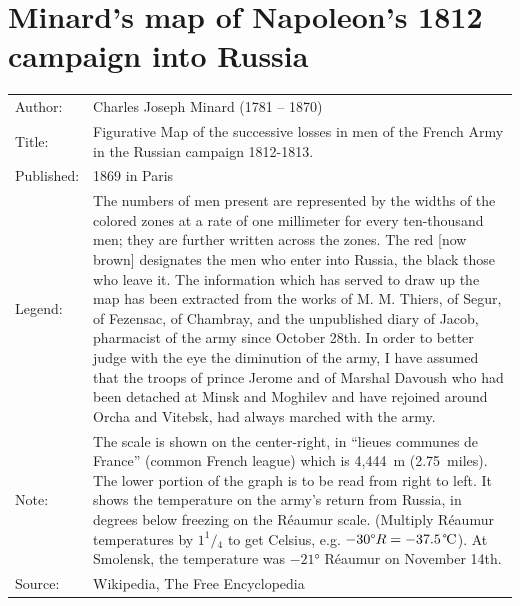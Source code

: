 \documentclass[a4paper,12pt,oneside]{book}
\begin{document}
\cleardoublepage
{}
{}
\listoffigures
\cleardoublepage
{}
{}
\listoftables

\appendix
\chapter{Minard’s map of Napoleon’s 1812 campaign into Russia}
\label{appdx:minard}
\begin{singlespace}
\begin{center}
\setlength{\extrarowheight}{3pt}
 \begin{tabularx}{\linewidth}{lX}
 Author:& Charles Joseph Minard (1781 -- 1870)\\
 Title:& Figurative Map of the successive losses in men of the French Army in the Russian campaign 1812-1813.\\
 Published: & 1869 in Paris \\
 Legend:& The numbers of men present are represented by the widths of the colored zones
 at a rate of one millimeter for every ten-thousand men; they are further written across the zones.
 The red [now brown] designates the men who enter into Russia, the black those who leave it.
 The information which has served to draw up the map has been extracted from
 the works of M. M. Thiers, of Segur, of Fezensac, of Chambray, and the unpublished
 diary of Jacob, pharmacist of the army since October 28th.
 In order to better judge with the eye the diminution of the army,
 I have assumed that the troops of prince Jerome and of Marshal Davoush who had been detached
 at Minsk and Moghilev and have rejoined around Orcha and Vitebsk, had always marched with the army.\\
 Note: & 
The scale is shown on the center-right, in ``lieues communes de France'' (common French league)
which is 4,444~m (2.75~miles).
The lower portion of the graph is to be read from right to left. It shows the temperature on the army's return
from Russia, in degrees below freezing on the Réaumur scale. (Multiply Réaumur temperatures by $1 ^1\!/\!_4$ to get Celsius,
e.g. $-30\text{\textdegree} R = -37.5\,\text{\textcelsius}$).
At Smolensk, the temperature was $-21$° Réaumur on November 14th.\\
Source:& Wikipedia, The Free Encyclopedia~\cite{wiki:Minard}
\end{tabularx}
\end{center}
\end{singlespace}
\end{document}
